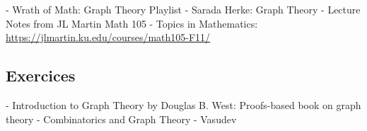 \documentclass{article}
\begin{document}
- Wrath of Math: Graph Theory Playlist
- Sarada Herke: Graph Theory
- Lecture Notes from JL Martin Math 105 - Topics in Mathematics:
\url{https://jlmartin.ku.edu/courses/math105-F11/}

\subsection{Exercices}%
\label{sub:Exercices}

- Introduction to Graph Theory by Douglas B. West: Proofs-based book on
graph theory
- Combinatorics and Graph Theory - Vasudev
\end{document}
